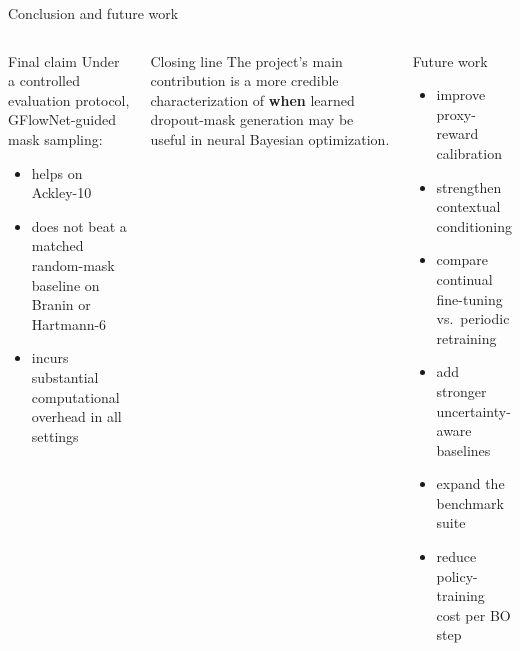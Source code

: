 \documentclass[aspectratio=169]{beamer}
\begin{document}
\begin{frame}{Conclusion and future work}
\vspace{-0.55em}
\begin{columns}[T,onlytextwidth]
\begin{minipage}[t][0.80\textheight]{\linewidth}\vspace{0pt}
  \begin{cardG}{Final claim}
  Under a controlled evaluation protocol, GFlowNet-guided mask sampling:
  \begin{itemize}
    \item helps on Ackley-10
    \item does not beat a matched random-mask baseline on Branin or Hartmann-6
    \item incurs substantial computational overhead in all settings
  \end{itemize}
  \end{cardG}

  \vfill

  \begin{cardA}{Closing line}
  The project's main contribution is a more credible characterization of \textbf{when} learned dropout-mask generation may be useful in neural Bayesian optimization.
  \end{cardA}
\end{minipage}

\begin{minipage}[t][0.80\textheight]{\linewidth}\vspace{0pt}
  \begin{card}{Future work}
  \begin{itemize}
    \item improve proxy-reward calibration
    \item strengthen contextual conditioning
    \item compare continual fine-tuning vs.\ periodic retraining
    \item add stronger uncertainty-aware baselines
    \item expand the benchmark suite
    \item reduce policy-training cost per BO step
  \end{itemize}
  \end{card}
\end{minipage}
\end{columns}
\end{frame}
\end{document}
